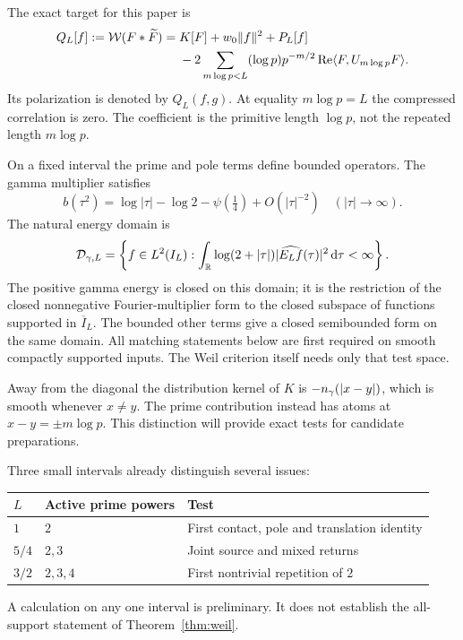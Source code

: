 The exact target for this paper is
\begin{align}
 Q_L[f]:=\mathcal W(F*\widetilde F)
 ={}&K[F]+w_0\lVert f\rVert^2+P_L[f]\notag\\
 &-2\sum_{m\log p<L}(\log p)p^{-m/2}
           \operatorname{Re}\langle F,U_{m\log p}F\rangle.
 \label{eq:target}
\end{align}
Its polarization is denoted by $Q_L(f,g)$. At equality $m\log p=L$
the compressed correlation is zero. The coefficient is the primitive
length $\log p$, not the repeated length $m\log p$.

On a fixed interval the prime and pole terms define bounded operators.
The gamma multiplier satisfies
\begin{equation}\label{eq:gamma-growth}
 b(\tau^2)=\log|\tau|-\log2-\psi(\tfrac14)+O(|\tau|^{-2})
 \quad (|\tau|\longrightarrow\infty).
\end{equation}
The natural energy domain is
\begin{equation}\label{eq:energy-domain}
 \mathcal D_{\gamma,L}=
 \left\{f\in L^2(I_L):
   \int_\mathbb R\log(2+|\tau|)|\widehat{E_Lf}(\tau)|^2\,\mathrm d\tau<\infty\right\}.
\end{equation}
The positive gamma energy is closed on this domain; it is the restriction
of the closed nonnegative Fourier-multiplier form to the closed subspace
of functions supported in $\overline I_L$. The bounded other terms give
a closed semibounded form on the same domain. All matching statements
below are first required on smooth compactly supported inputs. The Weil
criterion itself needs only that test space.

Away from the diagonal the distribution kernel of $K$ is
$-n_{\gamma}(|x-y|)$, which is smooth whenever $x\ne y$. The prime
contribution instead has atoms at $x-y=\pm m\log p$. This distinction
will provide exact tests for candidate preparations.

Three small intervals already distinguish several issues:
\begin{center}
\begin{tabular}{lll}
\toprule
$L$ & Active prime powers & Test \\
\midrule
$1$ & $2$ & First contact, pole and translation identity \\
$5/4$ & $2,3$ & Joint source and mixed returns \\
$3/2$ & $2,3,4$ & First nontrivial repetition of $2$ \\
\bottomrule
\end{tabular}
\end{center}
A calculation on any one interval is preliminary. It does not establish
the all-support statement of Theorem~\ref{thm:weil}.

